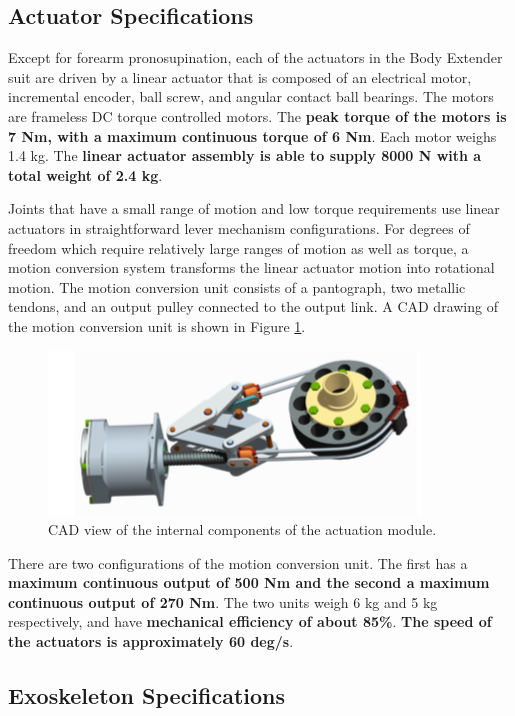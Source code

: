 \begin{refsection}
\subsection{Actuator Specifications}
 
 Except for forearm pronosupination, each of the actuators in the Body Extender suit are driven by a linear actuator that is composed of an electrical motor, incremental encoder, ball screw, and angular contact ball bearings.  The motors are frameless DC torque controlled motors.  The {\bf peak torque of the motors is 7 Nm, with a maximum continuous torque of 6 Nm}.  Each motor weighs 1.4 kg.  The {\bf linear actuator assembly is able to supply 8000 N with a total weight of 2.4 kg}.
 
 Joints that have a small range of motion and low torque requirements use linear actuators in straightforward lever mechanism configurations.  For degrees of freedom which require relatively large ranges of motion as well as torque, a motion conversion system transforms the linear actuator motion into rotational motion.  The motion conversion unit consists of a pantograph, two metallic tendons, and an output pulley connected to the output link.  A CAD drawing of the motion conversion unit is shown in Figure \ref{fig:motionConv}. 
 \begin{figure}[thpb]
\centering
\includegraphics[width=3.in]{exos/figs/bodyExt/motionConv}
  \caption{CAD view of the internal components of the actuation module.}
 \label{fig:motionConv}   
 \end{figure}
 There are two configurations of the motion conversion unit.  The first has a {\bf maximum continuous output of 500 Nm and the second a maximum continuous output of 270 Nm}.  The two units weigh 6 kg and 5 kg respectively, and have {\bf mechanical efficiency of about 85\%}.  {\bf The speed of the actuators is approximately 60 deg/s}.
 
 
 \subsection{Exoskeleton Specifications}
 

\end{refsection}
